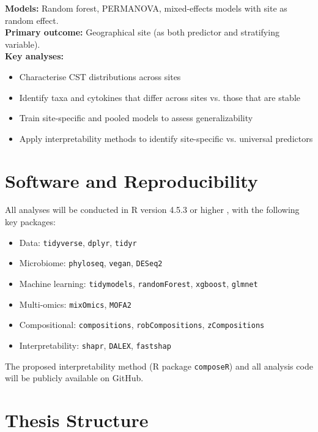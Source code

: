 \documentclass[12pt,a4paper]{report}
\begin{document}
\textbf{Models:} Random forest, PERMANOVA, mixed-effects models with site as random effect.\\
\textbf{Primary outcome:} Geographical site (as both predictor and stratifying variable).\\
\textbf{Key analyses:}
\begin{itemize}
    \item Characterise CST distributions across sites
    \item Identify taxa and cytokines that differ across sites vs. those that are stable
    \item Train site-specific and pooled models to assess generalizability
    \item Apply interpretability methods to identify site-specific vs. universal predictors
\end{itemize}

\section{Software and Reproducibility}

All analyses will be conducted in R version 4.5.3 or higher \cite{r2024}, with the following key packages:
\begin{itemize}
    \item Data: \texttt{tidyverse}, \texttt{dplyr}, \texttt{tidyr}
    \item Microbiome: \texttt{phyloseq}, \texttt{vegan}, \texttt{DESeq2}
    \item Machine learning: \texttt{tidymodels}, \texttt{randomForest}, \texttt{xgboost}, \texttt{glmnet}
    \item Multi-omics: \texttt{mixOmics}, \texttt{MOFA2}
    \item Compositional: \texttt{compositions}, \texttt{robCompositions}, \texttt{zCompositions}
    \item Interpretability: \texttt{shapr}, \texttt{DALEX}, \texttt{fastshap}
\end{itemize}

The proposed interpretability method (R package \texttt{composeR}) and all analysis code will be publicly available on GitHub.

\section{Thesis Structure}
\end{document}
